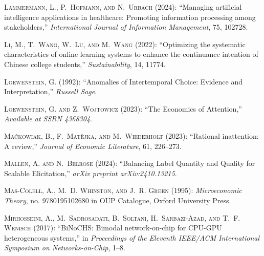 \documentclass[11pt]{article}
\theoremstyle{definition}
\theoremstyle{remark}
\begin{document}
\begin{thebibliography}{70}
\textsc{L{\"a}mmermann, L., P.~Hofmann, and N.~Urbach} (2024): \enquote{Managing artificial intelligence applications in healthcare: Promoting information processing among stakeholders,} \emph{International Journal of Information Management}, 75, 102728.

\textsc{Li, M., T.~Wang, W.~Lu, and M.~Wang} (2022): \enquote{Optimizing the systematic characteristics of online learning systems to enhance the continuance intention of Chinese college students,} \emph{Sustainability}, 14, 11774.

\textsc{Loewenstein, G.} (1992): \enquote{Anomalies of Intertemporal Choice: Evidence and Interpretation,} \emph{Russell Sage}.

\textsc{Loewenstein, G. and Z.~Wojtowicz} (2023): \enquote{The Economics of Attention,} \emph{Available at SSRN 4368304}.

\textsc{Ma{\'c}kowiak, B., F.~Mat{\v{e}}jka, and M.~Wiederholt} (2023): \enquote{Rational inattention: A review,} \emph{Journal of Economic Literature}, 61, 226--273.

\textsc{Mallen, A. and N.~Belrose} (2024): \enquote{Balancing Label Quantity and Quality for Scalable Elicitation,} \emph{arXiv preprint arXiv:2410.13215}.

\textsc{Mas-Colell, A., M.~D. Whinston, and J.~R. Green} (1995): \emph{{Microeconomic Theory}}, no. 9780195102680 in OUP Catalogue, Oxford University Press.

\textsc{Mirhosseini, A., M.~Sadrosadati, B.~Soltani, H.~Sarbazi-Azad, and T.~F. Wenisch} (2017): \enquote{BiNoCHS: Bimodal network-on-chip for CPU-GPU heterogeneous systems,} in \emph{Proceedings of the Eleventh IEEE/ACM International Symposium on Networks-on-Chip}, 1--8.


\end{thebibliography}
\end{document}
